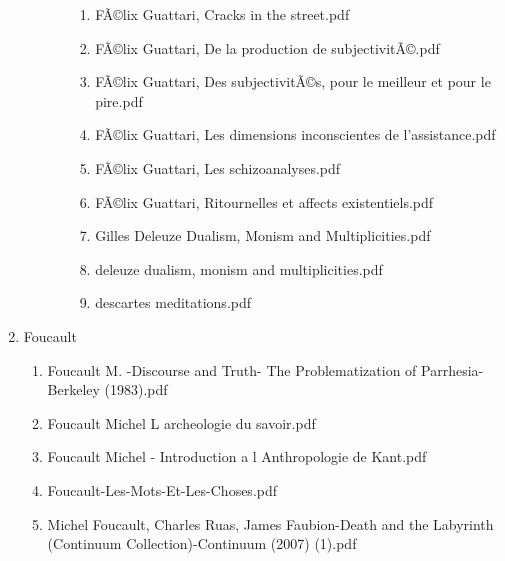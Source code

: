 \documentclass[11pt]{article}
\begin{document}
\begin{enumerate}
\begin{enumerate}
\begin{enumerate}
\begin{enumerate}
\item FÃ©lix Guattari, Cracks in the street.pdf
\label{sec-1-1-1-1-11-29-19-23-57-3}

\item FÃ©lix Guattari, De la production de subjectivitÃ©.pdf
\label{sec-1-1-1-1-11-29-19-23-57-4}

\item FÃ©lix Guattari, Des subjectivitÃ©s, pour le meilleur et pour le pire.pdf
\label{sec-1-1-1-1-11-29-19-23-57-5}

\item FÃ©lix Guattari, Les dimensions inconscientes de l'assistance.pdf
\label{sec-1-1-1-1-11-29-19-23-57-6}

\item FÃ©lix Guattari, Les schizoanalyses.pdf
\label{sec-1-1-1-1-11-29-19-23-57-7}

\item FÃ©lix Guattari, Ritournelles et affects existentiels.pdf
\label{sec-1-1-1-1-11-29-19-23-57-8}

\item Gilles Deleuze  Dualism, Monism and Multiplicities.pdf
\label{sec-1-1-1-1-11-29-19-23-57-9}

\item deleuze  dualism, monism and multiplicities.pdf
\label{sec-1-1-1-1-11-29-19-23-57-10}

\item descartes  meditations.pdf
\label{sec-1-1-1-1-11-29-19-23-57-11}
\end{enumerate}
\end{enumerate}
\end{enumerate}

\item Foucault
\label{sec-1-1-1-1-11-29-20}
\begin{enumerate}
\item Foucault M. -Discourse and Truth- The Problematization of Parrhesia-Berkeley (1983).pdf
\label{sec-1-1-1-1-11-29-20-1}

\item Foucault Michel  L archeologie du savoir.pdf
\label{sec-1-1-1-1-11-29-20-2}

\item Foucault Michel - Introduction a l Anthropologie de Kant.pdf
\label{sec-1-1-1-1-11-29-20-3}

\item Foucault-Les-Mots-Et-Les-Choses.pdf
\label{sec-1-1-1-1-11-29-20-4}

\item Michel Foucault, Charles Ruas, James Faubion-Death and the Labyrinth (Continuum Collection)-Continuum (2007) (1).pdf
\label{sec-1-1-1-1-11-29-20-5}


\end{enumerate}
\end{enumerate}
\end{document}
